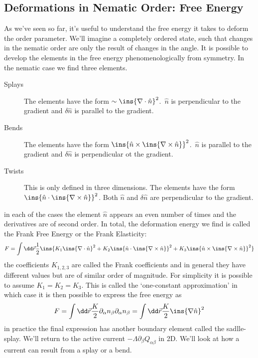 \subsection{Deformations in Nematic Order: Free Energy}
As we've seen so far, it's useful to understand the free energy it takes to deform the order parameter. We'll imagine a completely ordered state, such that changes in the nematic order are only the result of changes in the angle. It is possible to develop the elements in the free energy phenomenologically from symmetry. In the nematic case we find three elements.


\begin{description}
    \item[Splays] The elements have the form \(\sim\ins{\nabla \cdot \hat{n}}^2\).\  \(\hat{n}\) is perpendicular to the gradient and \(\delta\hat{n}\) is parallel to the gradient.
    \item[Bends] The elements have the form \(\ins{\hat{n}\times\ins{\nabla\times\hat{n}}}^2\).\  \(\hat{n}\) is parallel to the gradient and \(\delta\hat{n}\) is perpendicular ot the gradient.
    \item[Twists] This is only defined in three dimensions. The elements have the form \(\ins{\hat{n}\cdot\ins{\nabla\times\hat{n}}}^2\). Both \(\hat{n}\) and \(\delta\hat{n}\) are perpendicular to the gradient.
\end{description}
in each of the cases the element \(\hat{n}\) appears an even number of times and the derivatives are of second order. In total, the deformation energy we find is called the Frank Free Energy or the Frank Elasticity:
\begin{equation}
    F = \int \dd \vec{r} \frac{1}{2}\ins{K_1\ins{\nabla\cdot\hat{n}}^2+K_2\ins{\hat{n}\cdot\ins{\nabla\times\hat{n}}}^2+K_3\ins{\hat{n}\times\ins{\nabla\times\hat{n}}}^2}
\end{equation}
the coefficients \(K_{1,2,3}\) are called the Frank coefficients and in general they have different values but are of similar order of magnitude. For simplicity it is possible to assume \(K_1=K_2=K_3\). This is called the `one-constant approximation' in which case it is then possible to express the free energy as
\begin{equation}
    F = \int \dd \vec{r} \frac{K}{2}\partial_\alpha n_\beta\partial_\alpha n_\beta = \int\dd \vec{r} \frac{K}{2}\ins{\nabla\hat{n}}^2
\end{equation}
in practice the final expression has another boundary element called the sadlle-splay. We'll return to the active current \(-\Lambda\partial_\beta Q_{\alpha\beta}\) in 2D. We'll look at how a current can result from a splay or a bend.
